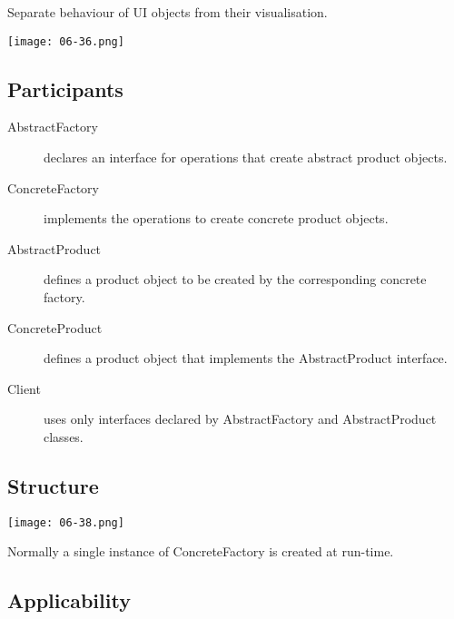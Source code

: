 Separate behaviour of UI objects from their visualisation.

\begin{center}
\texttt{[image: 06-36.png]}
\end{center}



\subsection{Participants}

\begin{description}
\item[AbstractFactory]
	
	declares an interface for operations that create abstract product objects.

\item[ConcreteFactory]

	implements the operations to create concrete product objects.

\item[AbstractProduct]

	defines a product object to be created by the corresponding concrete factory.

\item[ConcreteProduct]

	defines a product object that implements the AbstractProduct interface.

\item[Client]
	
	uses only interfaces declared by AbstractFactory and AbstractProduct classes.
\end{description}



\subsection{Structure}

\begin{center}
\texttt{[image: 06-38.png]}
\end{center}

Normally a single instance of ConcreteFactory is created at run-time.



\subsection{Applicability}

